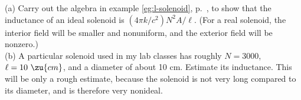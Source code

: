 (a) Carry out the algebra in example \ref{eg:l-solenoid},
p.~\pageref{eg:l-solenoid}, to show that the inductance
of an ideal solenoid is $(4\pi k/c^2)N^2A/\ell$. (For a
real solenoid, the interior field will be smaller and
nonuniform, and the exterior field will be nonzero.)\\
(b) A particular solenoid used in my lab classes has
roughly $N=3000$, $\ell=10\ \zu{cm}$, and a diameter
of about 10 cm. Estimate its inductance. This will be
only a rough estimate, because the solenoid is not very
long compared to its diameter, and is therefore very nonideal.


